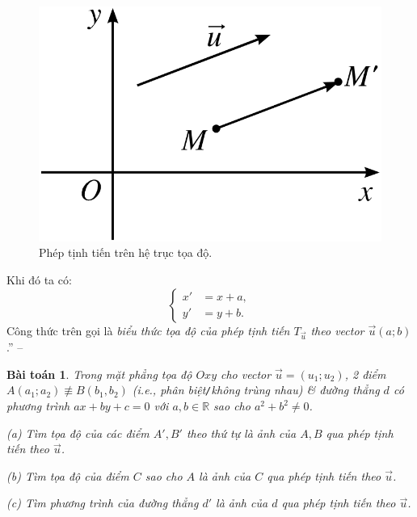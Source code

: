 \documentclass[oneside]{book}
\numberwithin{equation}{section}
\newtheorem{baitoan}{Bài toán}[section]
\begin{document}
\begin{figure}[H]
	\centering
	\includegraphics[scale=0.15]{phep_tinh_tien_tren_he_truc_toa_do}
	\caption{Phép tịnh tiến trên hệ trục tọa độ.}
	\label{fig:phep tinh tien tren he truc toa do}
\end{figure}
Khi đó ta có:
\begin{equation*}
	\boxed{\left\{\begin{split}
		x' &= x + a,\\
		y' &= y + b.
	\end{split}\right.}
\end{equation*}
Công thức trên gọi là \textit{biểu thức tọa độ của phép tịnh tiến $T_{\vec{u}}$ theo vector $\vec{u}(a;b)$}.'' -- \cite[pp. 6--7]{SGK_Toan_11_hinh_hoc_nang_cao}

\begin{baitoan}
	Trong mặt phẳng tọa độ $Oxy$ cho vector $\vec{u} = (u_1;u_2)$, 2 điểm $A(a_1;a_2)\not\equiv B(b_1,b_2)$ (i.e., phân biệt\emph{\texttt{/}}không trùng nhau) \& đường thẳng $d$ có phương trình $ax + by + c = 0$ với $a,b\in\mathbb{R}$ sao cho $a^2 + b^2\ne 0$.
	\begin{enumerate*}
		\item[(a)] Tìm tọa độ của các điểm $A',B'$ theo thứ tự là ảnh của $A,B$ qua phép tịnh tiến theo $\vec{u}$.
		\item[(b)] Tìm tọa độ của điểm $C$ sao cho $A$ là ảnh của $C$ qua phép tịnh tiến theo $\vec{u}$.
		\item[(c)] Tìm phương trình của đường thẳng $d'$  là ảnh của $d$ qua phép tịnh tiến theo $\vec{u}$.
	\end{enumerate*}
\end{baitoan}
\end{document}
